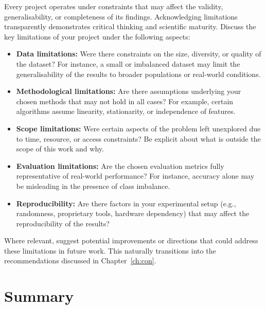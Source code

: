 Every project operates under constraints that may affect the validity,
generalisability, or completeness of its findings. Acknowledging limitations
transparently demonstrates critical thinking and scientific maturity. Discuss
the key limitations of your project under the following aspects:

\begin{itemize}
    \item \textbf{Data limitations:} Were there constraints on the size,
    diversity, or quality of the dataset? For instance, a small or imbalanced
    dataset may limit the generalisability of the results to broader populations
    or real-world conditions.

    \item \textbf{Methodological limitations:} Are there assumptions underlying
    your chosen methods that may not hold in all cases? For example, certain
    algorithms assume linearity, stationarity, or independence of features.

    \item \textbf{Scope limitations:} Were certain aspects of the problem left
    unexplored due to time, resource, or access constraints? Be explicit about
    what is outside the scope of this work and why.

    \item \textbf{Evaluation limitations:} Are the chosen evaluation metrics
    fully representative of real-world performance? For instance, accuracy alone
    may be misleading in the presence of class imbalance.

    \item \textbf{Reproducibility:} Are there factors in your experimental setup
    (e.g., randomness, proprietary tools, hardware dependency) that may affect
    the reproducibility of the results?
\end{itemize}

\noindent Where relevant, suggest potential improvements or directions that could
address these limitations in future work. This naturally transitions into the
recommendations discussed in Chapter~\ref{ch:con}.

\section{Summary}
\label{sec:discussion-summary}

